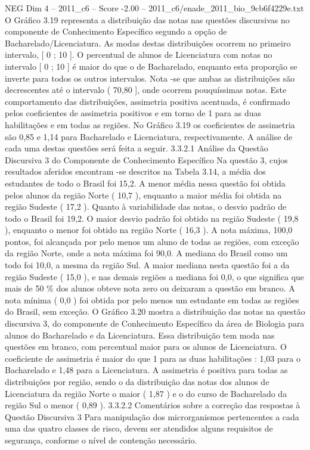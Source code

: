 \begin{textsample}{NEG Dim 4 – 2011\_c6 – Score -2.00 – 2011\_c6/enade\_2011\_bio\_9cb6f4229e.txt}
O Gráfico 3.19 representa a distribuição das notas nas questões discursivas no componente de Conhecimento Específico segundo a opção de Bacharelado/Licenciatura.
As modas destas distribuições ocorrem no primeiro intervalo, [ 0 ; 10 ].
O percentual de alunos de Licenciatura com notas no intervalo [ 0 ; 10 ] é maior do que o de Bacharelado, enquanto esta proporção se inverte para todos os outros intervalos.
Nota -se que ambas as distribuições são decrescentes até o intervalo ( 70,80 ], onde ocorrem pouquíssimas notas.
Este comportamento das distribuições, assimetria positiva acentuada, é confirmado pelos coeficientes de assimetria positivos e em torno de 1 para as duas habilitações e em todas as regiões.
No Gráfico 3.19 os coeficientes de assimetria são 0,85 e 1,14 para Bacharelado e Licenciatura, respectivamente.
A análise de cada uma destas questões será feita a seguir. 3.3.2.1 Análise da Questão Discursiva 3 do Componente de Conhecimento Específico Na questão 3, cujos resultados aferidos encontram -se descritos na Tabela 3.14, a média dos estudantes de todo o Brasil foi 15,2.
A menor média nessa questão foi obtida pelos alunos da região Norte ( 10,7 ), enquanto a maior média foi obtida na região Sudeste ( 17,2 ).
Quanto à variabilidade das notas, o desvio padrão de todo o Brasil foi 19,2.
O maior desvio padrão foi obtido na região Sudeste ( 19,8 ), enquanto o menor foi obtido na região Norte ( 16,3 ).
A nota máxima, 100,0 pontos, foi alcançada por pelo menos um aluno de todas as regiões, com exceção da região Norte, onde a nota máxima foi 90,0.
A mediana do Brasil como um todo foi 10,0, a mesma da região Sul.
A maior mediana nesta questão foi a da região Sudeste ( 15,0 ), e nas demais regiões a mediana foi 0,0, o que significa que mais de 50 \% dos alunos obteve nota zero ou deixaram a questão em branco.
A nota mínima ( 0,0 ) foi obtida por pelo menos um estudante em todas as regiões do Brasil, sem exceção.
O Gráfico 3.20 mostra a distribuição das notas na questão discursiva 3, do componente de Conhecimento Específico da área de Biologia para alunos do Bacharelado e da Licenciatura.
Essa distribuição tem moda nas questões em branco, com percentual maior para os alunos de Licenciatura.
O coeficiente de assimetria é maior do que 1 para as duas habilitações : 1,03 para o Bacharelado e 1,48 para a Licenciatura.
A assimetria é positiva para todas as distribuições por região, sendo o da distribuição das notas dos alunos de Licenciatura da região Norte o maior ( 1,87 ) e o do curso de Bacharelado da região Sul o menor ( 0,89 ). 3.3.2.2 Comentários sobre a correção das respostas à Questão Discursiva 3 Para manipulação dos microrganismos pertencentes a cada uma das quatro classes de risco, devem ser atendidos alguns requisitos de segurança, conforme o nível de contenção necessário.

\end{textsample}

